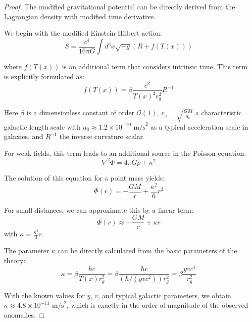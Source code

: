 \documentclass{article}
\theoremstyle{definition}
\theoremstyle{remark}
\newcommand{\Tfield}{T(x)} %
\begin{document}
	\begin{proof}
		The modified gravitational potential can be directly derived from the Lagrangian density with modified time derivative.
		
		We begin with the modified Einstein-Hilbert action:
		\begin{equation}
			S = \frac{c^4}{16\pi G}\int d^4x \sqrt{-g} \left(R + f(\Tfield) \right)
		\end{equation}
		
		where $f(\Tfield)$ is an additional term that considers intrinsic time. This term is explicitly formulated as:
		\begin{equation}
			f(\Tfield) = \beta \frac{c^2}{\Tfield^2 r_g^2} R^{-1}
		\end{equation}
		
		Here $\beta$ is a dimensionless constant of order $\mathcal{O}(1)$, $r_g = \sqrt{\frac{GM}{a_0}}$ a characteristic galactic length scale with $a_0 \approx 1.2 \times 10^{-10} \text{ m/s}^2$ as a typical acceleration scale in galaxies, and $R^{-1}$ the inverse curvature scalar.
		
		For weak fields, this term leads to an additional source in the Poisson equation:
		\begin{equation}
			\nabla^2 \Phi = 4\pi G \rho + \kappa^2
		\end{equation}
		
		The solution of this equation for a point mass yields:
		\begin{equation}
			\Phi(r) = -\frac{GM}{r} + \frac{\kappa^2}{6}r^2
		\end{equation}
		
		For small distances, we can approximate this by a linear term:
		\begin{equation}
			\Phi(r) \approx -\frac{GM}{r} + \kappa r
		\end{equation}
		with $\kappa = \frac{\kappa^2}{3}r$.
		
		The parameter $\kappa$ can be directly calculated from the basic parameters of the theory:
		\begin{equation}
			\kappa = \beta \frac{\hbar c}{\Tfield r_g^2} = \beta \frac{\hbar c}{(\hbar/(yvc^2)) r_g^2} = \beta \frac{yvc^4}{r_g^2}
		\end{equation}
		
		With the known values for $y$, $v$, and typical galactic parameters, we obtain $\kappa \approx 4.8 \times 10^{-11} \text{ m/s}^2$, which is exactly in the order of magnitude of the observed anomalies.
	\end{proof}
	
\end{document}

